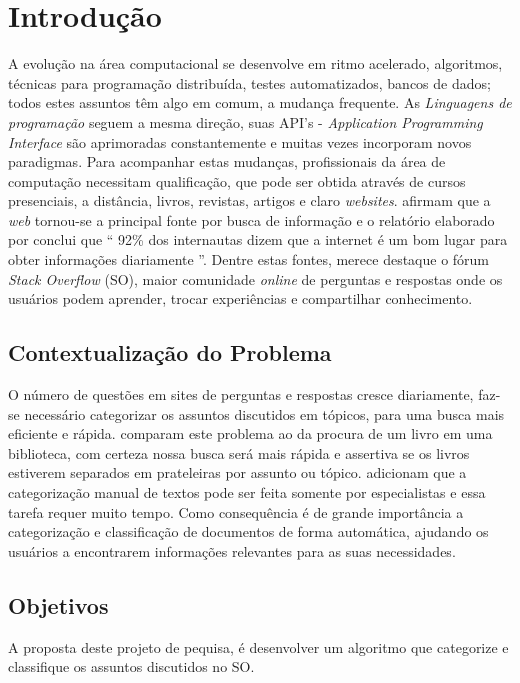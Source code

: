 \documentclass[10pt,a4paper,final]{article}
\begin{document}
    \folhaDeRosto

    \plano
    
    \section{Introdução}
    
A evolução na área computacional se desenvolve em ritmo acelerado, algoritmos, técnicas para programação distribuída, testes automatizados, bancos de dados; todos estes assuntos têm algo em comum, a mudança frequente. As \emph{Linguagens de programação} seguem a mesma direção, suas API's - \textit{Application Programming Interface} são aprimoradas constantemente e muitas vezes incorporam novos paradigmas. Para acompanhar estas mudanças, profissionais da área de computação necessitam qualificação, que pode ser obtida através de cursos presenciais, a distância, livros, revistas, artigos e claro \textit{websites}.
\newline
\newline
 \cite{Manning2009} afirmam que a \textit{web} tornou-se a principal fonte por busca de informação e o relatório elaborado por \cite{Fallows} conclui que \enquote{ 92\% dos internautas dizem que a internet é um bom lugar para obter informações diariamente }.
Dentre estas fontes, merece destaque o fórum \textit{Stack Overflow} (SO), maior comunidade \textit{online} de perguntas e respostas onde os usuários podem aprender, trocar experiências e compartilhar conhecimento.
    
    \subsection{Contextualização do Problema}
O número de questões em sites de perguntas e respostas cresce diariamente, faz-se necessário categorizar os assuntos discutidos em tópicos, para uma busca mais eficiente e rápida. \cite{Manning2009} comparam este problema ao da procura de um livro em uma biblioteca, com certeza nossa busca será mais rápida e assertiva se os livros estiverem separados em prateleiras por assunto ou tópico. \cite{Yasotha2016} adicionam que a categorização manual de textos pode ser feita somente por especialistas e essa tarefa requer muito tempo. Como consequência é de grande importância a categorização e classificação de documentos de forma automática, ajudando os usuários a encontrarem informações relevantes para as suas necessidades.

    \subsection{Objetivos}
A proposta deste projeto de pequisa, é desenvolver um algoritmo que categorize e classifique os assuntos discutidos no SO.
\end{document}
